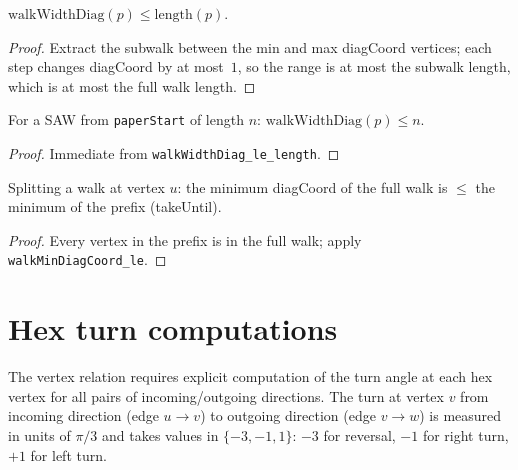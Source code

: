 \begin{lemma}
\begin{lemma}\label{lem:walk_width_diag_le}
\leanok
{}
  $\mathrm{walkWidthDiag}(p) \leq \mathrm{length}(p)$.
\end{lemma}
\begin{proof}\leanok
  Extract the subwalk between the min and max diagCoord vertices;
  each step changes diagCoord by at most~$1$, so the range is at
  most the subwalk length, which is at most the full walk length.
\end{proof}

\begin{lemma}\label{lem:saw_width_le}
\leanok
{}
  For a SAW from \texttt{paperStart} of length $n$:
  $\mathrm{walkWidthDiag}(p) \leq n$.
\end{lemma}
\begin{proof}\leanok Immediate from \texttt{walkWidthDiag\_le\_length}.\end{proof}

\begin{lemma}\label{lem:prefix_min_le}
\leanok
{}
  Splitting a walk at vertex $u$: the minimum diagCoord of the full
  walk is $\leq$ the minimum of the prefix (takeUntil).
\end{lemma}
\begin{proof}\leanok
  Every vertex in the prefix is in the full walk; apply
  \texttt{walkMinDiagCoord\_le}.
\end{proof}

\section{Hex turn computations}\label{sec:hex_turns}

The vertex relation requires explicit computation of the turn angle at each
hex vertex for all pairs of incoming/outgoing directions. The turn at vertex $v$
from incoming direction (edge $u \to v$) to outgoing direction (edge $v \to w$)
is measured in units of $\pi/3$ and takes values in $\{-3, -1, 1\}$:
$-3$ for reversal, $-1$ for right turn, $+1$ for left turn.


\end{lemma}
